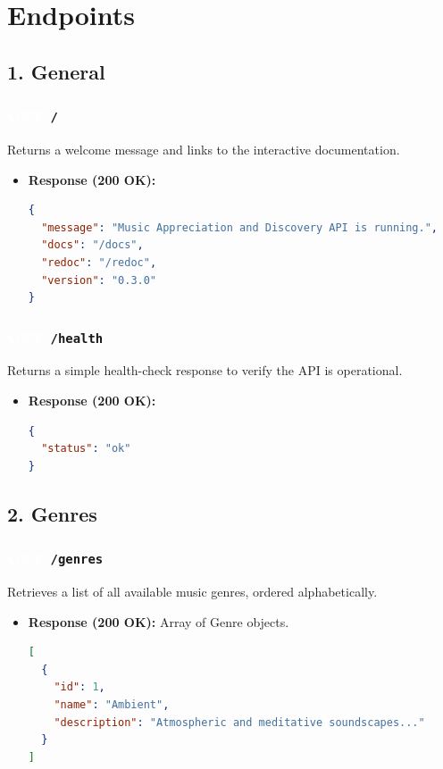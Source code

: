 \documentclass[11pt,a4paper]{article}
\newcommand{\methodGET}{\colorbox{getcolor}{\textcolor{white}{\textbf{GET}}}}
\begin{document}
\section{Endpoints}

\subsection{1. General}

\subsubsection*{\methodGET \texttt{ /}}
Returns a welcome message and links to the interactive documentation.
\begin{itemize}[label=\textcolor{primary}{\textbullet}, noitemsep]
    \item \textbf{Response (200 OK):}
\begin{lstlisting}[language=json]
{
  "message": "Music Appreciation and Discovery API is running.",
  "docs": "/docs",
  "redoc": "/redoc",
  "version": "0.3.0"
}
\end{lstlisting}
\end{itemize}

\subsubsection*{\methodGET \texttt{ /health}}
Returns a simple health-check response to verify the API is operational.
\begin{itemize}[label=\textcolor{primary}{\textbullet}, noitemsep]
    \item \textbf{Response (200 OK):}
\begin{lstlisting}[language=json]
{
  "status": "ok"
}
\end{lstlisting}
\end{itemize}

\subsection{2. Genres}

\subsubsection*{\methodGET \texttt{ /genres}}
Retrieves a list of all available music genres, ordered alphabetically.
\begin{itemize}[label=\textcolor{primary}{\textbullet}, noitemsep]
    \item \textbf{Response (200 OK):} Array of Genre objects.
\begin{lstlisting}[language=json]
[
  {
    "id": 1,
    "name": "Ambient",
    "description": "Atmospheric and meditative soundscapes..."
  }
]
\end{lstlisting}
\end{itemize}
\end{document}
